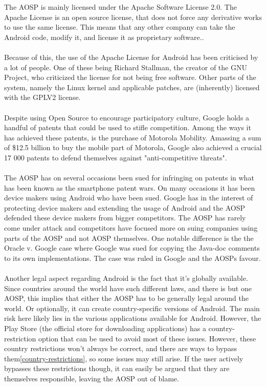 \documentclass[conference]{IEEEtran}
\begin{document}
The AOSP is mainly licensed under the Apache Software License 2.0. The Apache License is an open source license, that does not force any derivative works to use the same license. This means that any other company can take the Android code, modify it, and license it as proprietary software.\cite{apache-license}. 
\\\\Because of this, the use of the Apache License for Android has been criticised by a lot of people. One of these being Richard Stallman, the creator of the GNU Project, who criticized the license for not being free software.\cite{rms-Android} Other parts of the system, namely the Linux kernel and applicable patches, are (inherently) licensed with the GPLV2 license.\cite{gplv2}\cite{Android-licenses} 
\\\\Despite using Open Source to encourage participatory culture, Google holds a handful of patents that could be used to stifle competition.\cite{google-slide-unlock}\cite{google-radial-menu} Among the ways it has achieved these patents, is the purchase of Motorola Mobility. Amassing a sum of \$12.5 billion to buy the mobile part of Motorola, Google also achieved a crucial 17 000 patents to defend themselves against "anti-competitive threats".\cite{Goggin}
\\\\The AOSP has on several occasions been sued for infringing on patents in what has been known as the smartphone patent wars. On many occasions it has been device makers using Android who have been sued.\cite{Android-vApple} Google has in the interest of protecting device makers and extending the usage of Android and the AOSP defended these device makers from bigger competitors.\cite{google-helps} The AOSP has rarely come under attack and competitors have focused more on suing companies using parts of the AOSP and not AOSP themselves. One notable difference is the the Oracle v. Google case where Google was sued for copying the Java-doc comments to its own implementations.\cite{Android-v-oracle} The case was ruled in Google and the AOSPs favour.
\\\\Another legal aspect regarding Android is the fact that it's globally available. Since countries around the world have such different laws, and there is but one AOSP, this implies that either the AOSP has to be generally legal around the world. Or optionally, it can create country-specific versions of Android. The main risk here likely lies in the various applications available for Android. However, the Play Store (the official store for downloading applications) has a country-restriction option that can be used to avoid most of these issues. However, these country restrictions won't always be correct, and there are ways to bypass them\ref{country-restrictions}, so some issues may still arise. If the user actively bypasses these restrictions though, it can easily be argued that they are themselves responsible, leaving the AOSP out of blame. 
\end{document}
